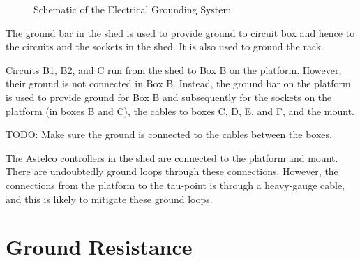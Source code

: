 \begin{figure*}
\begin{center}
{
}
\end{center}
\caption{Schematic of the Electrical Grounding System}
\label{figure:schematic-electrical-grounding-system}
\end{figure*}

The ground bar in the shed is used to provide ground to circuit box and hence to the circuits and the sockets in the shed. It is also used to ground the rack.

Circuits B1, B2, and C run from the shed to Box B on the platform. However, their ground is not connected in Box B. Instead, the ground bar on the platform is used to provide ground for Box B and subsequently for the sockets on the platform (in boxes B and C), the cables to boxes C, D, E, and F, and the mount.

TODO: Make sure the ground is connected to the cables between the boxes.

The Astelco controllers in the shed are connected to the platform and mount. There are undoubtedly ground loops through these connections. However, the connections from the platform to the tau-point is through a heavy-gauge cable, and this is likely to mitigate these ground loops.

\ifcoatlioan

\section{Ground Resistance}

